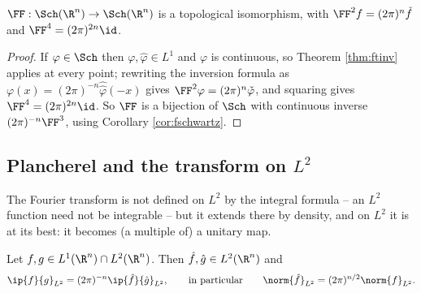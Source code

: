 \begin{corollary}\label{cor:fsiso}
	$\FF : \Sch(\R^n)\to\Sch(\R^n)$ is a topological isomorphism, with $\FF^2 f = (2\pi)^n\check f$ and $\FF^4 = (2\pi)^{2n}\id$.
\end{corollary}

\begin{proof}
	If $\varphi \in \Sch$ then $\varphi, \hat\varphi \in L^1$ and $\varphi$ is continuous, so Theorem \ref{thm:ftinv} applies at every point; rewriting the inversion formula as $\varphi(x) = (2\pi)^{-n}\hat{\hat\varphi}(-x)$ gives $\FF^2\varphi = (2\pi)^n\check\varphi$, and squaring gives $\FF^4 = (2\pi)^{2n}\id$. So $\FF$ is a bijection of $\Sch$ with continuous inverse $(2\pi)^{-n}\FF^3$, using Corollary \ref{cor:fschwartz}.
\end{proof}

\subsection{Plancherel and the transform on \texorpdfstring{$L^2$}{L2}}

The Fourier transform is not defined on $L^2$ by the integral formula -- an $L^2$ function need not be integrable -- but it extends there by density, and on $L^2$ it is at its best: it becomes (a multiple of) a unitary map.

\begin{theorem}\label{aof-thm:plancherel}
	Let $f, g \in L^1(\R^n)\cap L^2(\R^n)$. Then $\hat f, \hat g \in L^2(\R^n)$ and
	$$\ip{f}{g}_{L^2} = (2\pi)^{-n}\ip{\hat f}{\hat g}_{L^2}, \qquad \text{in particular} \qquad \norm{\hat f}_{L^2}=(2\pi)^{n/2}\norm{f}_{L^2}.$$
\end{theorem}

